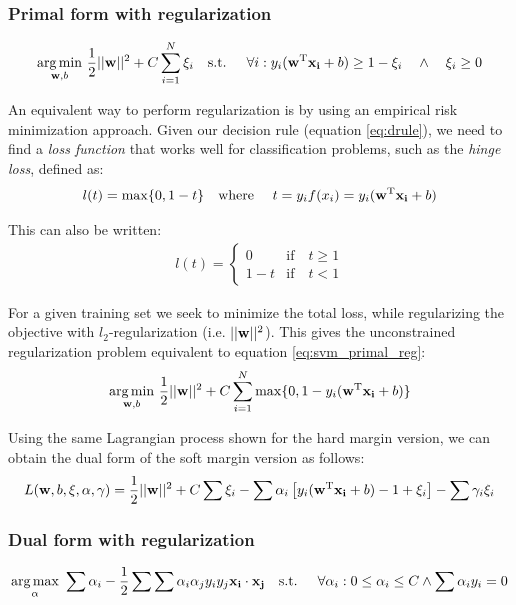 \subsubsection*{Primal form with regularization}
\begin{align}\label{eq:svm_primal_reg} 
    \underset{\mathbf{w}, b}{\text{arg} \min}\ \frac{1}{2} ||\mathbf{w}||^2 + C \sum_{i=1}^{N} \xi_i
    \text{\quad s.t. \quad} 
    \forall i : y_i (\mathbf{w}^{\text{T}} \mathbf{x_i} + b) \ge 1 - \xi_i \quad \land \quad \xi_i \ge 0
\end{align}

An equivalent way to perform regularization is by using an empirical risk mini\-mization approach. Given our decision rule (equation \ref{eq:drule}), we need to find a \emph{loss function} that works well for classification problems, such as the \emph{hinge loss}, defined as:
\begin{align}
    l(t) = \max \{0, 1 - t\} \text{\quad where \quad} t = y_if(x_i) = y_i (\mathbf{w}^{\text{T}} \mathbf{x_i} + b)
\end{align}

This can also be written:
\begin{align*}
    l(t) = \left\{
        \begin{array}{ll}
            0   & \mbox{if} \quad t \ge 1 \\
            1-t & \mbox{if} \quad t < 1  
        \end{array}
    \right.
\end{align*}

For a given training set we seek to minimize the total loss, while regularizing the objective with $l_2$-regularization (i.e. $||\mathbf{w}||^2$). This gives the unconstrained reg\-u\-lar\-iza\-tion problem equivalent to equation \ref{eq:svm_primal_reg}:
\begin{align}
    \underset{\mathbf{w}, b}{\text{arg} \min}\ \frac{1}{2} ||\mathbf{w}||^2 + C \sum_{i=1}^{N} \max \{0, 1 -  y_i (\mathbf{w}^{\text{T}} \mathbf{x_i} + b)\}
\end{align}

Using the same Lagrangian process shown for the hard margin version, we can obtain the dual form of the soft margin version as follows:
\begin{align*}
    L(\mathbf{w}, b, \mathbf{\xi}, \mathbf{\alpha}, \mathbf{\gamma}) = 
    \frac{1}{2} ||\mathbf{w}||^2 + C \sum \xi_i
    - \sum \alpha_i \left[ y_i (\mathbf{w}^{\text{T}} \mathbf{x_i} + b) - 1 + \xi_i \right]
    - \sum \gamma_i \xi_i
\end{align*}

\subsubsection*{Dual form with regularization}
\begin{align}\label{eq:svm_dual_reg} 
    \underset{\mathbf{\alpha}}{\text{arg} \max}\ \sum \alpha_i - \frac{1}{2} \sum \sum \alpha_i \alpha_j y_i y_j \mathbf{x_i} \cdot \mathbf{x_j}
    \text{\quad s.t. \quad} \forall \alpha_i : 0 \le \alpha_i \le C \land \sum \alpha_i y_i = 0
\end{align}

